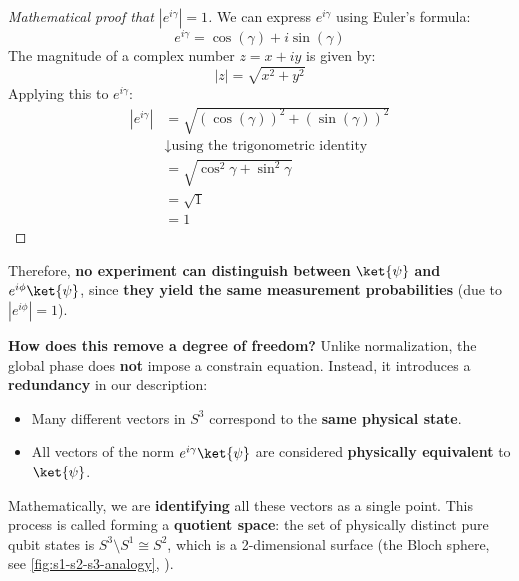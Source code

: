 \begin{itemize}
    \begin{proof}[Mathematical proof that $\left|e^{i\gamma}\right| = 1$]
        We can express $e^{i\gamma}$ using Euler's formula:
        \begin{equation*}
            e^{i\gamma} = \cos(\gamma) + i\sin(\gamma)
        \end{equation*}
        The magnitude of a complex number $z = x + iy$ is given by:
        \begin{equation*}
            \left|z\right| = \sqrt{x^2 + y^2}
        \end{equation*}
        Applying this to $e^{i\gamma}$:
        \begin{align*}
            \left|e^{i\gamma}\right| &= \sqrt{\left(\cos(\gamma)\right)^2 + \left(\sin(\gamma)\right)^2} \\[.2em]
            &\downarrow \text{using the trigonometric identity} \\[.2em]
            &= \sqrt{\cos^2 \gamma + \sin^2 \gamma} \\[.2em]
            &= \sqrt{1} \\[.2em]
            &= 1
        \end{align*}
    \end{proof}
    Therefore, \textbf{no experiment can distinguish between} $\ket{\psi}$ \textbf{and} $e^{i\phi}\ket{\psi}$, since \textbf{they yield the same measurement probabilities} (due to $\left|e^{i\phi}\right| = 1$).

    \textcolor{Green3}{ \textbf{How does this remove a degree of freedom?}} Unlike normalization, the global phase does \textbf{not} impose a constrain equation. Instead, it introduces a \textbf{redundancy} in our description:
    \begin{itemize}
        \item Many different vectors in $S^{3}$ correspond to the \textbf{same physical state}.
        \item All vectors of the norm $e^{i\gamma}\ket{\psi}$ are considered \textbf{physically equivalent} to $\ket{\psi}$.
    \end{itemize}
    Mathematically, we are \textbf{identifying} all these vectors as a single point. This process is called forming a \textbf{quotient space}: the set of physically distinct pure qubit states is $S^{3} \setminus S^{1} \cong S^{2}$, which is a 2-dimensional surface (the Bloch sphere, see \autoref{fig:s1-s2-s3-analogy}, ).
\end{itemize}
